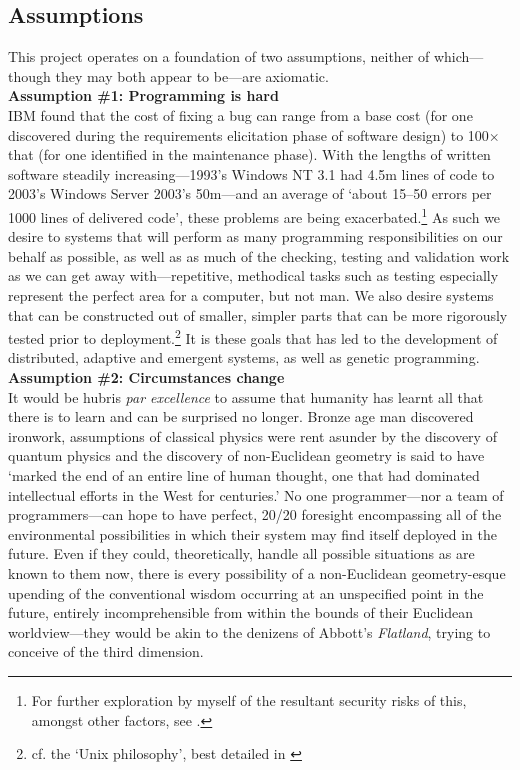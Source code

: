\documentclass[compsoc,12pt,a4paper]{IEEEtran}
\begin{document}
		\subsection{Assumptions}
		
			This project operates on a foundation of two assumptions, neither of which---though they may both appear to be---are axiomatic.\\
			
			\noindent \textbf{Assumption \#1: Programming is hard}\\
			
			\noindent IBM found that the cost of fixing a bug can range from a base cost (for one discovered during the requirements elicitation phase of software design) to 100$\times$ that (for one identified in the maintenance phase).\cite{bugcost} With the lengths of written software steadily increasing---1993's Windows NT 3.1 had 4.5m lines of code to 2003's Windows Server 2003's 50m---and an average of `about 15--50 errors per 1000 lines of delivered code',\cite{1000} these problems are being exacerbated.\footnote{For further exploration by myself of the resultant security risks of this, amongst other factors, see \cite{cni}.} As such we desire to systems that will perform as many programming responsibilities on our behalf as possible, as well as as much of the checking, testing and validation work as we can get away with---repetitive, methodical tasks such as testing especially represent the perfect area for a computer, but not man. We also desire systems that can be constructed out of smaller, simpler parts that can be more rigorously tested prior to deployment.\footnote{cf. the `Unix philosophy', best detailed in \cite{unix}} It is these goals that has led to the development of distributed, adaptive and emergent systems, as well as genetic programming.\\
				
			\noindent \textbf{Assumption \#2: Circumstances change}\\
			
			\noindent It would be hubris \textit{par excellence} to assume that humanity has learnt all that there is to learn and can be surprised no longer. Bronze age man discovered ironwork, assumptions of classical physics were rent asunder by the discovery of quantum physics and the discovery of non-Euclidean geometry is said to have `marked the end of an entire line of human thought, one that had dominated intellectual efforts in the West for centuries.'\cite{geometry} No one programmer---nor a team of programmers---can hope to have perfect, 20/20 foresight encompassing all of the environmental possibilities in which their system may find itself deployed in the future. Even if they could, theoretically, handle all possible situations as are known to them now, there is every possibility of a non-Euclidean geometry-esque upending of the conventional wisdom occurring at an unspecified point in the future, entirely incomprehensible from within the bounds of their Euclidean worldview---they would be akin to the denizens of Abbott's \textit{Flatland}, trying to conceive of the third dimension.
			
\end{document}
